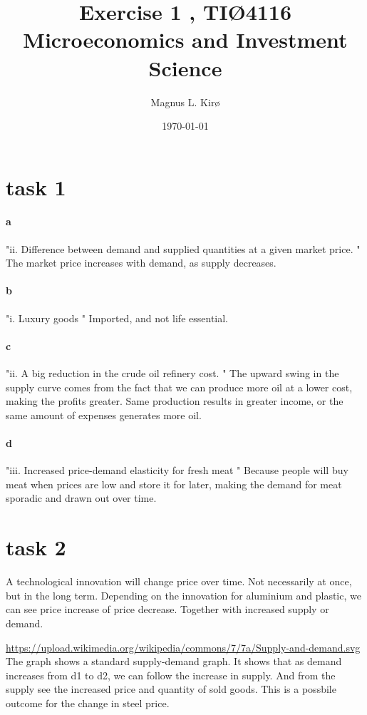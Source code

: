 \documentclass[12pt, a4paper]{article}
\title{
	Exercise 1 , TIØ4116 Microeconomics and Investment Science 
}
\author{
	Magnus L. Kirø
}
\date{\today}
\begin{document}
\maketitle
{}



\section{task 1}
\paragraph{a}
"ii.
Difference between demand and supplied quantities at a given market price. "
The market price increases with demand, as supply decreases. 

\paragraph{b}
"i.
Luxury goods "
Imported, and not life essential. 

\paragraph{c}
"ii.
A big reduction in the crude oil refinery cost. "
The upward swing in the supply curve comes from the fact that we can produce
more oil at a lower cost, making the profits greater. Same production results
in greater income, or the same amount of expenses generates more oil. 

\paragraph{d}
"iii.
Increased price-demand elasticity for fresh meat "
Because people will buy meat when prices are low and store it for later, making
the demand for meat sporadic and drawn out over time.

\section{task 2}
A technological innovation will change price over time. 
Not necessarily at once, but in the long term. 
Depending on the innovation for aluminium and plastic, we can see price
increase of price decrease. Together with increased supply or demand. 

\url{https://upload.wikimedia.org/wikipedia/commons/7/7a/Supply-and-demand.svg}
The graph shows a standard supply-demand graph. It shows that as demand
increases from d1 to d2, we can follow the increase in supply. And from the
supply see the increased price and quantity of sold goods. This is a possbile
outcome for the change in steel price. 
\end{document}
